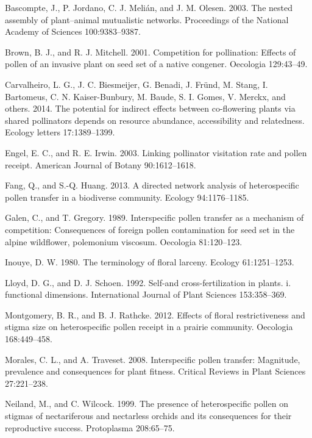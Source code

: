 \documentclass[11pt,a4paper]{article}
\begin{document}
\hypertarget{ref-bascompte2003}{}
Bascompte, J., P. Jordano, C. J. Melián, and J. M. Olesen. 2003. The
nested assembly of plant--animal mutualistic networks. Proceedings of
the National Academy of Sciences 100:9383--9387.

\hypertarget{ref-brown2001}{}
Brown, B. J., and R. J. Mitchell. 2001. Competition for pollination:
Effects of pollen of an invasive plant on seed set of a native congener.
Oecologia 129:43--49.

\hypertarget{ref-carvalheiro2014}{}
Carvalheiro, L. G., J. C. Biesmeijer, G. Benadi, J. Fründ, M. Stang, I.
Bartomeus, C. N. Kaiser-Bunbury, M. Baude, S. I. Gomes, V. Merckx, and
others. 2014. The potential for indirect effects between co-flowering
plants via shared pollinators depends on resource abundance,
accessibility and relatedness. Ecology letters 17:1389--1399.

\hypertarget{ref-engel2003}{}
Engel, E. C., and R. E. Irwin. 2003. Linking pollinator visitation rate
and pollen receipt. American Journal of Botany 90:1612--1618.

\hypertarget{ref-fang2013}{}
Fang, Q., and S.-Q. Huang. 2013. A directed network analysis of
heterospecific pollen transfer in a biodiverse community. Ecology
94:1176--1185.

\hypertarget{ref-galen1989}{}
Galen, C., and T. Gregory. 1989. Interspecific pollen transfer as a
mechanism of competition: Consequences of foreign pollen contamination
for seed set in the alpine wildflower, polemonium viscosum. Oecologia
81:120--123.

\hypertarget{ref-inouye1980}{}
Inouye, D. W. 1980. The terminology of floral larceny. Ecology
61:1251--1253.

\hypertarget{ref-lloyd1992}{}
Lloyd, D. G., and D. J. Schoen. 1992. Self-and cross-fertilization in
plants. i. functional dimensions. International Journal of Plant
Sciences 153:358--369.

\hypertarget{ref-montgomery2012}{}
Montgomery, B. R., and B. J. Rathcke. 2012. Effects of floral
restrictiveness and stigma size on heterospecific pollen receipt in a
prairie community. Oecologia 168:449--458.

\hypertarget{ref-morales2008}{}
Morales, C. L., and A. Traveset. 2008. Interspecific pollen transfer:
Magnitude, prevalence and consequences for plant fitness. Critical
Reviews in Plant Sciences 27:221--238.

\hypertarget{ref-neiland1999}{}
Neiland, M., and C. Wilcock. 1999. The presence of heterospecific pollen
on stigmas of nectariferous and nectarless orchids and its consequences
for their reproductive success. Protoplasma 208:65--75.
\end{document}
